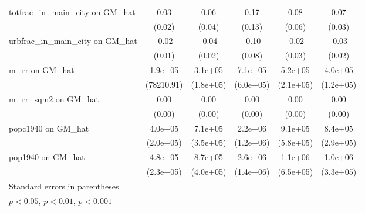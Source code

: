 \begin{table}[htbp]
\begin{tabular}{l*{5}{c}}
\addlinespace
totfrac\_in\_main\_city on GM\_hat&     0.03         &     0.06         &     0.17         &     0.08         &     0.07\sym{*}  \\
                &   (0.02)         &   (0.04)         &   (0.13)         &   (0.06)         &   (0.03)         \\
\addlinespace
urbfrac\_in\_main\_city on GM\_hat&    -0.02         &    -0.04         &    -0.10         &    -0.02         &    -0.03         \\
                &   (0.01)         &   (0.02)         &   (0.08)         &   (0.03)         &   (0.02)         \\
\addlinespace
m\_rr on GM\_hat  &  1.9e+05\sym{*}  &  3.1e+05         &  7.1e+05         &  5.2e+05\sym{*}  &  4.0e+05\sym{**} \\
                &(78210.91)         &(1.8e+05)         &(6.0e+05)         &(2.1e+05)         &(1.2e+05)         \\
\addlinespace
m\_rr\_sqm2 on GM\_hat&     0.00         &     0.00         &     0.00\sym{*}  &     0.00         &     0.00\sym{**} \\
                &   (0.00)         &   (0.00)         &   (0.00)         &   (0.00)         &   (0.00)         \\
\addlinespace
popc1940 on GM\_hat&  4.0e+05\sym{*}  &  7.1e+05\sym{*}  &  2.2e+06         &  9.1e+05         &  8.4e+05\sym{**} \\
                &(2.0e+05)         &(3.5e+05)         &(1.2e+06)         &(5.8e+05)         &(2.9e+05)         \\
\addlinespace
pop1940 on GM\_hat&  4.8e+05\sym{*}  &  8.7e+05\sym{*}  &  2.6e+06         &  1.1e+06         &  1.0e+06\sym{**} \\
                &(2.3e+05)         &(4.0e+05)         &(1.4e+06)         &(6.5e+05)         &(3.3e+05)         \\
\bottomrule
\multicolumn{6}{l}{\footnotesize Standard errors in parentheses}\\
\multicolumn{6}{l}{\footnotesize \sym{*} \(p<0.05\), \sym{**} \(p<0.01\), \sym{***} \(p<0.001\)}\\
\end{tabular}
\end{table}
